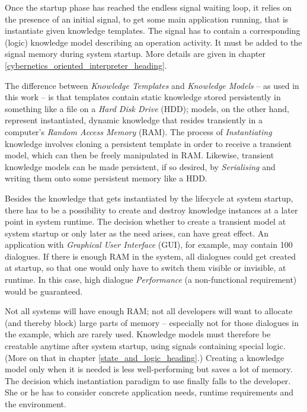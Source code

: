 Once the startup phase has reached the endless signal waiting loop, it relies
on the presence of an initial signal, to get some main application running,
that is instantiate given knowledge templates. The signal has to contain a
corresponding (logic) knowledge model describing an operation activity. It must
be added to the signal memory during system startup. More details are given in
chapter \ref{cybernetics_oriented_interpreter_heading}.

The difference between \emph{Knowledge Templates} and \emph{Knowledge Models}
-- as used in this work -- is that templates contain static knowledge stored
persistently in something like a file on a \emph{Hard Disk Drive} (HDD);
models, on the other hand, represent instantiated, dynamic knowledge that
resides transiently in a computer's \emph{Random Access Memory} (RAM). The
process of \emph{Instantiating} knowledge involves cloning a persistent template
in order to receive a transient model, which can then be freely manipulated in
RAM. Likewise, transient knowledge models can be made persistent, if so desired,
by \emph{Serialising} and writing them onto some persistent memory like a HDD.

Besides the knowledge that gets instantiated by the lifecycle at system startup,
there has to be a possibility to create and destroy knowledge instances at a
later point in system runtime. The decision whether to create a transient model
at system startup or only later as the need arises, can have great effect. An
application with \emph{Graphical User Interface} (GUI), for example, may contain
100 dialogues. If there is enough RAM in the system, all dialogues could get
created at startup, so that one would only have to switch them visible or
invisible, at runtime. In this case, high dialogue \emph{Performance} (a
non-functional requirement) would be guaranteed.

Not all systems will have enough RAM; not all developers will want to allocate
(and thereby block) large parts of memory -- especially not for those dialogues
in the example, which are rarely used. Knowledge models must therefore be
creatable anytime after system startup, using signals containing special logic.
(More on that in chapter \ref{state_and_logic_heading}.) Creating a knowledge
model only when it is needed is less well-performing but saves a lot of memory.
The decision which instantiation paradigm to use finally falls to the
developer. She or he has to consider concrete application needs, runtime
requirements and the environment.

